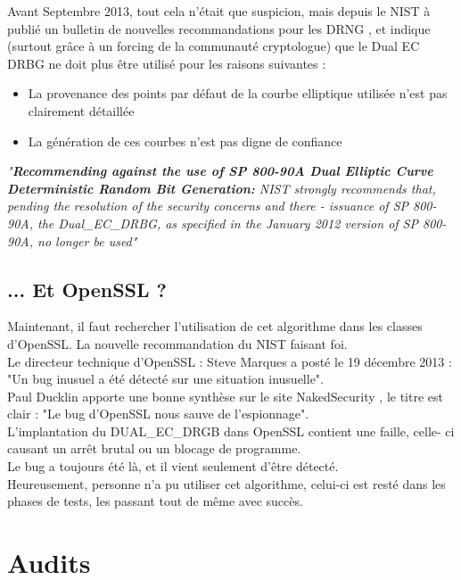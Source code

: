	Avant Septembre 2013, tout cela n'était que suspicion, mais depuis le 
	NIST à publié un bulletin de nouvelles recommandations pour les DRNG
	\cite{newRecomendingNist}, et indique (surtout grâce à un forcing de 
	la communauté cryptologue) que le Dual EC DRBG ne doit plus être utilisé 
	pour les raisons suivantes :
	\begin{itemize}
		\item La provenance des points par défaut de la courbe elliptique 
		utilisée n'est pas clairement détaillée
		\item La génération de ces courbes n'est pas digne de confiance\\
	\end{itemize}
	\textit{"\textbf{Recommending against the use of SP 800-90A Dual Elliptic 
	Curve Deterministic Random Bit Generation:} NIST strongly recommends that, 
	pending the resolution of the security concerns and there - issuance of SP 
	800-90A, the Dual\_EC\_DRBG, as specified in the January 2012 version of 
	SP 800-90A, no longer be used"}\\

	\subsection{... Et OpenSSL ?}
	
	Maintenant, il faut rechercher l'utilisation de cet algorithme dans les 
	classes d'OpenSSL. La nouvelle recommandation du NIST faisant foi.\\

	Le directeur technique d'OpenSSL : Steve Marques a posté le 19 décembre 
	2013 : "Un bug inusuel a été détecté sur une situation inusuelle". \\
	
	Paul Ducklin apporte une bonne synthèse sur le site NakedSecurity
	\cite{duckin2013openssl}, le titre est clair : "Le bug d'OpenSSL nous
	sauve de l'espionnage".\\
	
	L'implantation du DUAL\_EC\_DRGB dans OpenSSL contient une faille, celle-
	ci causant un arrêt brutal ou un blocage de programme.\\
	Le bug a toujours été là, et il vient seulement d'être détecté.\\
	Heureusement, personne n'a pu utiliser cet algorithme, celui-ci est resté 
	dans les phases de tests, les passant tout de même avec succès.\\

\section{Audits}

